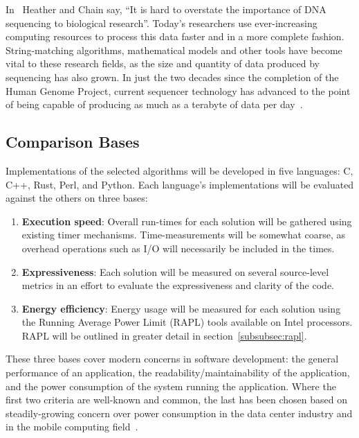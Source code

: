In~\cite{heather} Heather and Chain say, ``It is hard to overstate the importance of DNA sequencing to biological research''. Today's researchers use ever-increasing computing resources to process this data faster and in a more complete fashion. String-matching algorithms, mathematical models and other tools have become vital to these research fields, as the size and quantity of data produced by sequencing has also grown. In just the two decades since the completion of the Human Genome Project, current sequencer technology has advanced to the point of being capable of producing as much as a terabyte of data per day~\cite{cabral}.

\subsection{Comparison Bases}
\label{subsec:comparison}

Implementations of the selected algorithms will be developed in five languages: C, C++, Rust, Perl, and Python. Each language's implementations will be evaluated against the others on three bases:

\begin{enumerate}
\item \textbf{Execution speed}: Overall run-times for each solution will be gathered using existing timer mechanisms. Time-measurements will be somewhat coarse, as overhead operations such as I/O will necessarily be included in the times.
\item \textbf{Expressiveness}: Each solution will be measured on several source-level metrics in an effort to evaluate the expressiveness and clarity of the code.
\item \textbf{Energy efficiency}: Energy usage will be measured for each solution using the Running Average Power Limit (RAPL) tools available on Intel processors. RAPL will be outlined in greater detail in section~\ref{subsubsec:rapl}.
\end{enumerate}

These three bases cover modern concerns in software development: the general performance of an application, the readability/maintainability of the application, and the power consumption of the system running the application. Where the first two criteria are well-known and common, the last has been chosen based on steadily-growing concern over power consumption in the data center industry and in the mobile computing field~\cite{pereira}.
